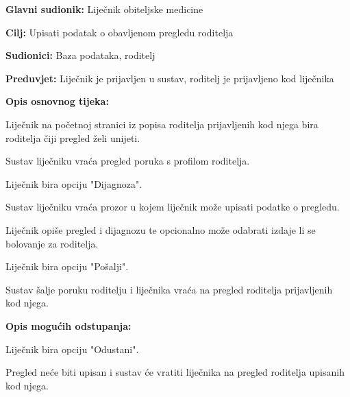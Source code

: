 					\noindent {}
					\begin{packed_item}
						
						\item \textbf{Glavni sudionik: }Liječnik obiteljske medicine
						\item  \textbf{Cilj:} Upisati podatak o obavljenom pregledu roditelja
						\item  \textbf{Sudionici:} Baza podataka, roditelj
						\item  \textbf{Preduvjet:} Liječnik je prijavljen u sustav, roditelj je prijavljeno kod liječnika
						\item  \textbf{Opis osnovnog tijeka:}
						
						\item[] \begin{packed_enum}
							
							\item Liječnik na početnoj stranici iz popisa roditelja prijavljenih kod njega bira roditelja čiji pregled želi unijeti.
							\item Sustav liječniku vraća pregled poruka s profilom roditelja.
							\item Liječnik bira opciju "Dijagnoza".
							\item Sustav liječniku vraća prozor u kojem liječnik može upisati podatke o pregledu.
							\item Liječnik opiše pregled i dijagnozu te opcionalno može odabrati izdaje li se bolovanje za roditelja.
							\item Liječnik bira opciju "Pošalji".
							\item Sustav šalje poruku roditelju i liječnika vraća na pregled roditelja prijavljenih kod njega.
						\end{packed_enum}
						
						\item  \textbf{Opis mogućih odstupanja:}
						
						\item[] \begin{packed_item}
							
							\item[6.a] Liječnik bira opciju "Odustani".
							\item[] \begin{packed_enum}
								
								\item Pregled neće biti upisan i sustav će vratiti liječnika na pregled roditelja upisanih kod njega.
							\end{packed_enum}
							
							
						\end{packed_item}
						
						
					\end{packed_item}
					
